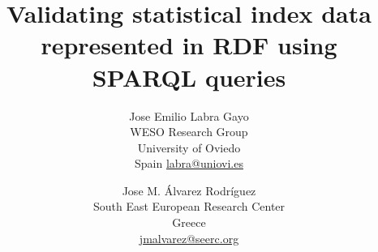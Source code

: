 \title{Validating statistical index data represented 
      in RDF using SPARQL queries} 
\author{Jose Emilio Labra Gayo \\
WESO Research Group \\
University of Oviedo\\
Spain 
\href{mailto:labra@uniovi.es}{labra@uniovi.es}
\and 
Jose M. \'{A}lvarez Rodr\'{i}guez \\
South East European Research Center\\
Greece \\
\href{mailto:jmalvarez@seerc.org}{jmalvarez@seerc.org}
}
\date{}

\maketitle

